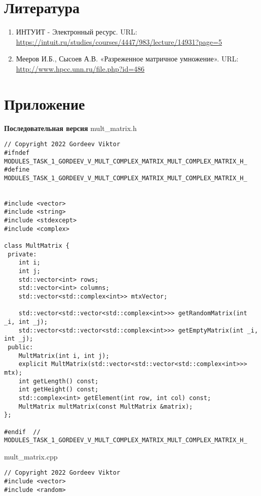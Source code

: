 \documentclass{report}
\begin{document}
\begin{enumerate}
\section*{Литература}
\begin{enumerate}
\item ИНТУИТ - Электронный ресурс. URL: \newline \url{https://intuit.ru/studies/courses/4447/983/lecture/14931?page=5}
\item Мееров И.Б., Сысоев А.В. «Разреженное матричное умножение». URL: \newline \url{http://www.hpcc.unn.ru/file.php?id=486}
\end{enumerate}
\newpage

\section*{Приложение}
\textbf{Последовательная версия}
\newline
\newline mult_matrix.h
\begin{lstlisting}
// Copyright 2022 Gordeev Viktor
#ifndef MODULES_TASK_1_GORDEEV_V_MULT_COMPLEX_MATRIX_MULT_COMPLEX_MATRIX_H_
#define MODULES_TASK_1_GORDEEV_V_MULT_COMPLEX_MATRIX_MULT_COMPLEX_MATRIX_H_


#include <vector>
#include <string>
#include <stdexcept>
#include <complex>

class MultMatrix {
 private:
    int i;
    int j;
    std::vector<int> rows;
    std::vector<int> columns;
    std::vector<std::complex<int>> mtxVector;

    std::vector<std::vector<std::complex<int>>> getRandomMatrix(int _i, int _j);
    std::vector<std::vector<std::complex<int>>> getEmptyMatrix(int _i, int _j);
 public:
    MultMatrix(int i, int j);
    explicit MultMatrix(std::vector<std::vector<std::complex<int>>> mtx);
    int getLength() const;
    int getHeight() const;
    std::complex<int> getElement(int row, int col) const;
    MultMatrix multMatrix(const MultMatrix &matrix);
};

#endif  // MODULES_TASK_1_GORDEEV_V_MULT_COMPLEX_MATRIX_MULT_COMPLEX_MATRIX_H_

\end{lstlisting}
mult_matrix.cpp
\begin{lstlisting}
// Copyright 2022 Gordeev Viktor
#include <vector>
#include <random>


\end{lstlisting}
\end{enumerate}
\end{document}

